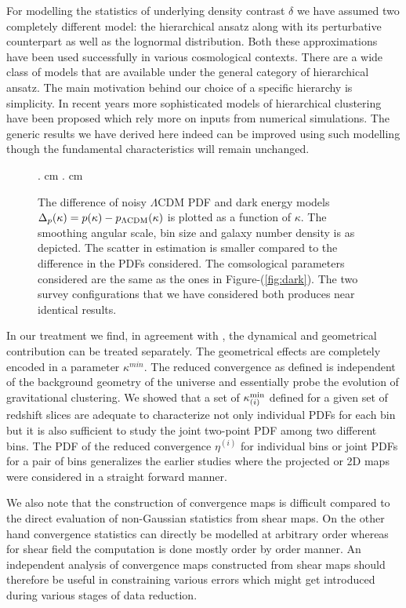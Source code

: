 \documentclass[usenatbib]{mn2e}
\begin{document}
For modelling the statistics of underlying density contrast $\delta$ we have assumed two
completely different model: the hierarchical ansatz along with its perturbative 
counterpart as well as the lognormal distribution. Both these approximations
have been used successfully in various cosmological contexts. There are a wide class of models that
are available under the general category of hierarchical ansatz. 
The main motivation behind our choice of a specific hierarchy is simplicity.
In recent years more sophisticated models of hierarchical clustering have been
proposed which rely more on inputs from numerical simulations. The generic results
we have derived here indeed can be improved using such modelling though the fundamental
characteristics will remain unchanged.
%
\begin{figure}
\begin{center}
{. cm . cm {}}
\end{center}
\caption{The difference of noisy $\Lambda$CDM PDF and dark energy models $\Delta_p(\kappa)=p(\kappa)-p_{\Lambda \rm CDM}(\kappa)$ 
is plotted as a function of $\kappa$. The smoothing angular scale, bin size and galaxy number density is as depicted.
The scatter in estimation is smaller compared to the difference in the PDFs considered. The comsological parameters
considered are the same as the ones in Figure-(\ref{fig:dark}). The two survey configurations that we have considered
both produces near identical results.}
\label{fig:10}
\end{figure}
%
%
In our treatment we find, in agreement with \cite{MuWa03}, the dynamical and geometrical 
contribution can be treated separately. The geometrical effects are completely encoded in
a parameter $\kappa^{min}$. The reduced convergence as defined is independent of 
the background geometry of the universe and essentially probe the evolution of
gravitational clustering. We showed that a set of $\kappa^{\rm min}_{(i)}$ defined
for a given set of redshift slices are adequate to characterize not only
individual PDFs for each bin but it is also sufficient to study the 
joint two-point PDF among two different bins. The PDF of the reduced convergence
$\eta^{(i)}$ for individual bins or joint PDFs for a pair of bins 
generalizes the earlier studies where the projected or 2D maps 
were considered in a straight forward manner. 
%

We also note that the construction of convergence maps is difficult compared to the direct evaluation of 
non-Gaussian statistics from shear maps. On the other hand convergence statistics 
can directly be modelled at arbitrary order whereas for shear field the computation
is done mostly order by order manner. An independent analysis of convergence 
maps constructed from shear maps should therefore be useful in constraining
various errors which might get introduced during various stages of data reduction.
%
\end{document}
